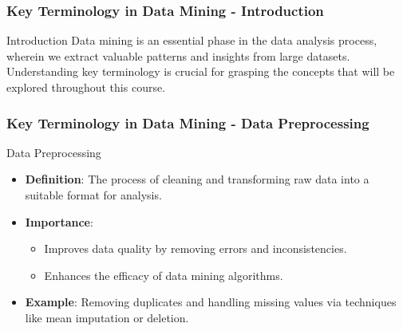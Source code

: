 \documentclass{beamer}
\begin{document}
\begin{frame}[fragile]
    \frametitle{Key Terminology in Data Mining - Introduction}
    \begin{block}{Introduction}
        Data mining is an essential phase in the data analysis process, wherein we extract valuable patterns and insights from large datasets. Understanding key terminology is crucial for grasping the concepts that will be explored throughout this course.
    \end{block}
\end{frame}

\begin{frame}[fragile]
    \frametitle{Key Terminology in Data Mining - Data Preprocessing}
    \begin{block}{Data Preprocessing}
        \begin{itemize}
            \item \textbf{Definition}: The process of cleaning and transforming raw data into a suitable format for analysis.
            \item \textbf{Importance}:
                \begin{itemize}
                    \item Improves data quality by removing errors and inconsistencies.
                    \item Enhances the efficacy of data mining algorithms.
                \end{itemize}
            \item \textbf{Example}: Removing duplicates and handling missing values via techniques like mean imputation or deletion.
        \end{itemize}
    \end{block}
\end{frame}
\end{document}
